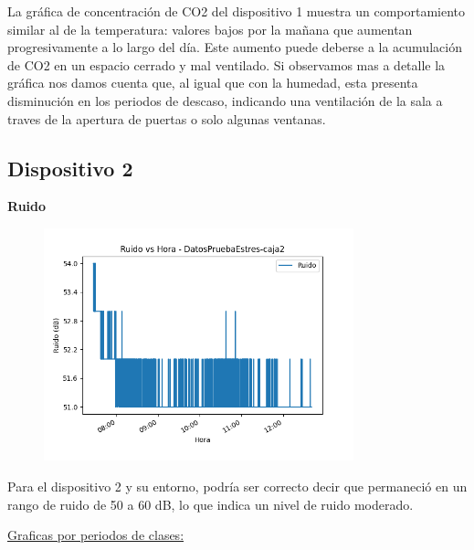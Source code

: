 \documentclass{templateNote}
\begin{document}
\begin{tcolorbox}
    La gráfica de concentración de CO2 del dispositivo 1 muestra un comportamiento similar al de la temperatura: valores bajos por la mañana que aumentan progresivamente a lo largo del día. Este aumento puede deberse a la acumulación de CO2 en un espacio cerrado y mal ventilado. Si observamos mas a detalle la gráfica nos damos cuenta que, al igual que con la humedad, esta presenta disminución en los periodos de descaso, indicando una ventilación de la sala a traves de la apertura de puertas o solo algunas ventanas.
\end{tcolorbox}

\newpage
\subsection{Dispositivo 2}

\textbf{Ruido}
\begin{figure}[H]
    \centering
    \includegraphics[width=0.8\textwidth]{img/DatosPruebaEstres-caja2_ruido_vs_hora.png}
\end{figure}

\begin{tcolorbox}
    Para el dispositivo 2 y su entorno, podría ser correcto decir que permaneció en un rango de ruido de 50 a 60 dB, lo que indica un nivel de ruido moderado.
\end{tcolorbox}

\newpage
\underline{Graficas por periodos de clases:}
\end{document}
